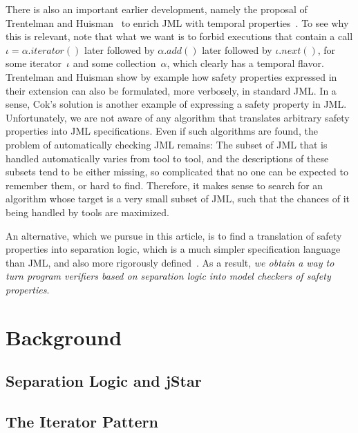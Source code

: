 \documentclass[a4paper]{article}
\theoremstyle{slanted}
\theoremstyle{definition}
\theoremstyle{remark}
\begin{document}
There is also an important earlier development, namely the proposal of Trentelman and Huisman~\cite{trentelman2002} to enrich JML with temporal properties~\cite{pnueli1977}.
To see why this is relevant, note that what we want is to forbid executions that contain a call $\iota=\alpha.\mathit{iterator}()$ later followed by $\alpha.\mathit{add}()$ later followed by $\iota.\mathit{next}()$, for some iterator~$\iota$ and some collection~$\alpha$, which clearly has a temporal flavor.
Trentelman and Huisman show by example how safety properties expressed in their extension can also be formulated, more verbosely, in standard JML\null.
In a sense, Cok's solution is another example of expressing a safety property in JML\null.
Unfortunately, we are not aware of any algorithm that translates arbitrary safety properties into JML specifications.
Even if such algorithms are found, the problem of automatically checking JML remains:
The subset of JML that is handled automatically varies from tool to tool, and the descriptions of these subsets tend to be either missing, so complicated that no one can be expected to remember them, or hard to find.
Therefore, it makes sense to search for an algorithm whose target is a very small subset of JML, such that the chances of it being handled by tools are maximized.

An alternative, which we pursue in this article, is to find a translation of safety properties into separation logic, which is a much simpler specification language than JML, and also more rigorously defined~\cite{reynolds2002}. 
As a result, \emph{we obtain a way to turn program verifiers based on separation logic into model checkers of safety properties}.

\section{Background}

\subsection{Separation Logic and jStar}

\subsection{The Iterator Pattern}

\end{document}
